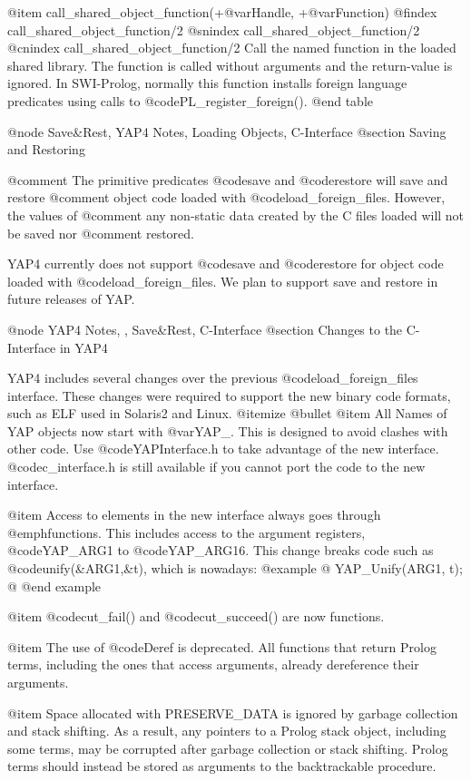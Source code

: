 {{{{{{{{{@item call_shared_object_function(+@var{Handle}, +@var{Function})
@findex call_shared_object_function/2
@snindex call_shared_object_function/2
@cnindex call_shared_object_function/2
    Call the named function in the loaded shared library. The function
    is called without arguments and the return-value is
    ignored. In SWI-Prolog, normally this function installs foreign
    language predicates using calls to @code{PL_register_foreign()}.
@end table

@node Save&Rest, YAP4 Notes, Loading Objects, C-Interface
@section Saving and Restoring

@comment The primitive predicates @code{save} and @code{restore} will save and restore
@comment object code loaded with @code{load_foreign_files}. However, the values of
@comment any non-static data created by the C files loaded will not be saved nor
@comment restored.

YAP4 currently does not support @code{save} and @code{restore} for object code
loaded with @code{load_foreign_files}. We plan to support save and restore
in future releases of YAP.

@node YAP4 Notes, , Save&Rest, C-Interface
@section Changes to the C-Interface in YAP4

YAP4 includes several changes over the previous @code{load_foreign_files}
interface. These changes were required to support the new binary code
formats, such as ELF used in Solaris2 and Linux.
@itemize @bullet
@item All Names of YAP objects now start with @var{YAP_}. This is
designed to avoid clashes with other code. Use @code{YAPInterface.h} to
take advantage of the new interface. @code{c_interface.h} is still
available if you cannot port the code to the new interface.

@item Access to elements in the new interface always goes through
@emph{functions}. This includes access to the argument registers,
@code{YAP_ARG1} to @code{YAP_ARG16}. This change breaks code such as
@code{unify(&ARG1,&t)}, which is nowadays:
@example
@{
   YAP_Unify(ARG1, t);
@}
@end example

@item @code{cut_fail()} and @code{cut_succeed()} are now functions.

@item The use of @code{Deref} is deprecated. All functions that return
Prolog terms, including the ones that access arguments, already
dereference their arguments.

@item Space allocated with PRESERVE_DATA is ignored by garbage
collection and stack shifting. As a result, any pointers to a Prolog
stack object, including some terms, may be corrupted after garbage
collection or stack shifting. Prolog terms should instead be stored as
arguments to the backtrackable procedure.

}}}}}}}}}
